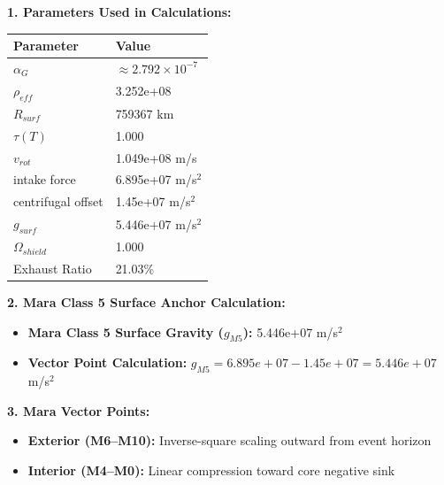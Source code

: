 \documentclass[11pt, a4paper]{article}
\begin{document}
\vspace{0.5em}
\noindent \textbf{1. Parameters Used in Calculations:}
\begin{center}
  \begin{tabular}{|l|l|}
    \hline
    \textbf{Parameter} & \textbf{Value} \\ \hline
    $\alpha_G$ & $\approx 2.792 \times 10^{-7}$ \\ \hline
    $\rho_{eff}$ & 3.252e+08 \\ \hline
    $R_{surf}$ & 759367 km \\ \hline
    $\tau(T)$ & 1.000 \\ \hline
    $v_{rot}$ & 1.049e+08 m/s \\ \hline
    intake force & 6.895e+07 m/s$^2$ \\ \hline
    centrifugal offset & 1.45e+07 m/s$^2$ \\ \hline
    $g_{surf}$ & 5.446e+07 m/s$^2$ \\ \hline
    $\Omega_{shield}$ & 1.000 \\ \hline
    Exhaust Ratio & 21.03\% \\ \hline
  \end{tabular}
\end{center}

\vspace{0.5em}
\noindent \textbf{2. Mara Class 5 Surface Anchor Calculation:}
\begin{itemize}
  \item \textbf{Mara Class 5 Surface Gravity ($g_{M5}$):} 5.446e+07 m/s$^2$
  \item \textbf{Vector Point Calculation:} $g_{M5} = 6.895e+07 - 1.45e+07 = 5.446e+07$ m/s$^2$
\end{itemize}

\vspace{0.5em}
\noindent \textbf{3. Mara Vector Points:}
\begin{itemize}
  \item \textbf{Exterior (M6--M10):} Inverse-square scaling outward from event horizon
  \item \textbf{Interior (M4--M0):} Linear compression toward core negative sink
\end{itemize}
\end{document}
